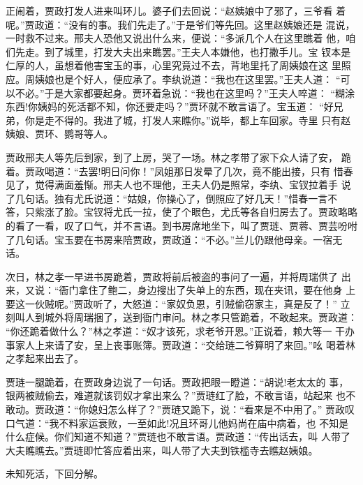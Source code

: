 正闹着，贾政打发人进来叫环儿。婆子们去回说：“赵姨娘中了邪了，三爷看
着呢。”贾政道：“没有的事。我们先走了。”于是爷们等先回。这里赵姨娘还是
混说，一时救不过来。邢夫人恐他又说出什么来，便说：“多派几个人在这里瞧着
他，咱们先走。到了城里，打发大夫出来瞧罢。”王夫人本嫌他，也打撒手儿。宝
钗本是仁厚的人，虽想着他害宝玉的事，心里究竟过不去，背地里托了周姨娘在这
里照应。周姨娘也是个好人，便应承了。李纨说道：“我也在这里罢。”王夫人道：
“可以不必。”于是大家都要起身。贾环着急说：“我也在这里吗？”王夫人啐道：
“糊涂东西!你姨妈的死活都不知，你还要走吗？”贾环就不敢言语了。宝玉道：
“好兄弟，你是走不得的。我进了城，打发人来瞧你。”说毕，都上车回家。寺里
只有赵姨娘、贾环、鹦哥等人。

贾政邢夫人等先后到家，到了上房，哭了一场。林之孝带了家下众人请了安，
跪着。贾政喝道：“去罢!明日问你！”凤姐那日发晕了几次，竟不能出接，只有
惜春见了，觉得满面羞惭。邢夫人也不理他，王夫人仍是照常，李纨、宝钗拉着手
说了几句话。独有尤氏说道：“姑娘，你操心了，倒照应了好几天！”惜春一言不
答，只紫涨了脸。宝钗将尤氏一拉，使了个眼色，尤氏等各自归房去了。贾政略略
的看了一看，叹了口气，并不言语。到书房席地坐下，叫了贾琏、贾蓉、贾芸吩咐
了几句话。宝玉要在书房来陪贾政，贾政道：“不必。”兰儿仍跟他母亲。一宿无
话。

次日，林之孝一早进书房跪着，贾政将前后被盗的事问了一遍，并将周瑞供了
出来，又说：“衙门拿住了鲍二，身边搜出了失单上的东西，现在夹讯，要在他身
上要这一伙贼呢。”贾政听了，大怒道：“家奴负恩，引贼偷窃家主，真是反了！”
立刻叫人到城外将周瑞捆了，送到衙门审问。林之孝只管跪着，不敢起来。贾政道：
“你还跪着做什么？”林之孝道：“奴才该死，求老爷开恩。”正说着，赖大等一
干办事家人上来请了安，呈上丧事账簿。贾政道：“交给琏二爷算明了来回。”吆
喝着林之孝起来出去了。

贾琏一腿跪着，在贾政身边说了一句话。贾政把眼一瞪道：“胡说!老太太的
事，银两被贼偷去，难道就该罚奴才拿出来么？”贾琏红了脸，不敢言语，站起来
也不敢动。贾政道：“你媳妇怎么样了？”贾琏又跪下，说：“看来是不中用了。”
贾政叹口气道：“我不料家运衰败，一至如此!况且环哥儿他妈尚在庙中病着，也
不知是什么症候。你们知道不知道？”贾琏也不敢言语。贾政道：“传出话去，叫
人带了大夫瞧瞧去。”贾琏即忙答应着出来，叫人带了大夫到铁槛寺去瞧赵姨娘。

未知死活，下回分解。
